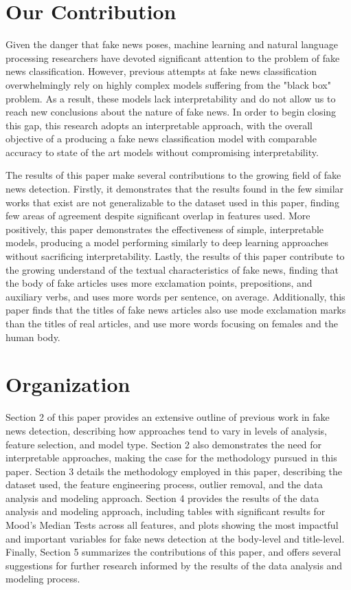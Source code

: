 \documentclass[../thesis.tex]{subfiles}
\begin{document}
\section{Our Contribution}
Given the danger that fake news poses, machine learning and natural language processing researchers have devoted significant attention to the problem of fake news classification. However, previous attempts at fake news classification overwhelmingly rely on highly complex models suffering from the "black box" problem. As a result, these models lack interpretability and do not allow us to reach new conclusions about the nature of fake news. In order to begin closing this gap, this research adopts an interpretable approach, with the overall objective of a producing a fake news classification model with comparable accuracy to state of the art models without compromising interpretability.

The results of this paper make several contributions to the growing field of fake news detection. Firstly, it demonstrates that the results found in the few similar works that exist are not generalizable to the dataset used in this paper, finding few areas of agreement despite significant overlap in features used. More positively, this paper demonstrates the effectiveness of simple, interpretable models, producing a model performing similarly to deep learning approaches without sacrificing interpretability. Lastly, the results of this paper contribute to the growing understand of the textual characteristics of fake news, finding that the body of fake articles uses more exclamation points, prepositions, and auxiliary verbs, and uses more words per sentence, on average. Additionally, this paper finds that the titles of fake news articles also use mode exclamation marks than the titles of real articles, and use more words focusing on females and the human body.

\section{Organization}

Section 2 of this paper provides an extensive outline of previous work in fake news detection, describing how approaches tend to vary in levels of analysis, feature selection, and model type. Section 2 also demonstrates the need for interpretable approaches, making the case for the methodology pursued in this paper. Section 3 details the methodology employed in this paper, describing the dataset used, the feature engineering process, outlier removal, and the data analysis and modeling approach. Section 4 provides the results of the data analysis and modeling approach, including tables with significant results for Mood's Median Tests across all features, and plots showing the most impactful and important variables for fake news detection at the body-level and title-level. Finally, Section 5 summarizes the contributions of this paper, and offers several suggestions for further research informed by the results of the data analysis and modeling process.
\end{document}

